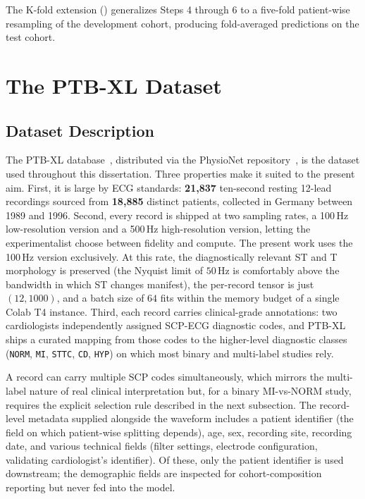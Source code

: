 The K-fold extension () generalizes Steps 4 through 6 to a five-fold patient-wise resampling of the development cohort, producing fold-averaged predictions on the test cohort.

\section{The PTB-XL Dataset}

\subsection{Dataset Description}

The PTB-XL database~\cite{wagner2020ptbxl}, distributed via the PhysioNet repository~\cite{goldberger2000physiobank}, is the dataset used throughout this dissertation. Three properties make it suited to the present aim. First, it is large by ECG standards: \textbf{21{,}837} ten-second resting 12-lead recordings sourced from \textbf{18{,}885} distinct patients, collected in Germany between 1989 and 1996. Second, every record is shipped at two sampling rates, a 100\,Hz low-resolution version and a 500\,Hz high-resolution version, letting the experimentalist choose between fidelity and compute. The present work uses the 100\,Hz version exclusively. At this rate, the diagnostically relevant ST and T morphology is preserved (the Nyquist limit of $50$\,Hz is comfortably above the bandwidth in which ST changes manifest), the per-record tensor is just $(12, 1000)$, and a batch size of $64$ fits within the memory budget of a single Colab T4 instance. Third, each record carries clinical-grade annotations: two cardiologists independently assigned SCP-ECG diagnostic codes, and PTB-XL ships a curated mapping from those codes to the higher-level diagnostic classes (\texttt{NORM}, \texttt{MI}, \texttt{STTC}, \texttt{CD}, \texttt{HYP}) on which most binary and multi-label studies rely.

A record can carry multiple SCP codes simultaneously, which mirrors the multi-label nature of real clinical interpretation but, for a binary MI-vs-NORM study, requires the explicit selection rule described in the next subsection. The record-level metadata supplied alongside the waveform includes a patient identifier (the field on which patient-wise splitting depends), age, sex, recording site, recording date, and various technical fields (filter settings, electrode configuration, validating cardiologist's identifier). Of these, only the patient identifier is used downstream; the demographic fields are inspected for cohort-composition reporting but never fed into the model.

